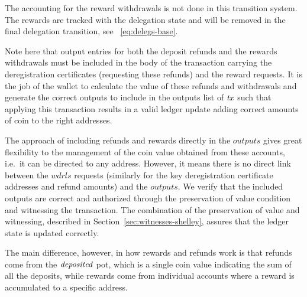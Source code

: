 The accounting for the reward withdrawals is not done in this transition system.
The rewards are tracked with the delegation state and will
be removed in the final delegation transition, see ~\ref{eq:delegs-base}.

Note here that output entries for both the deposit refunds and the rewards
withdrawals must be included in the body of the transaction
carrying the deregistration certificates (requesting these refunds) and the
reward requests. It is the job
of the wallet to calculate the value of these refunds and withdrawals and
generate the correct outputs to include in the outputs list of $\mathit{tx}$ such
that applying this transaction results in a
valid ledger update adding correct amounts of coin to the right addresses.

The approach of including refunds and rewards directly in the $outputs$ gives
great flexibility to the management of the coin value obtained from these
accounts, i.e.~it can be directed to any address. However, it means there is no
direct link between the $wdrls$ requests (similarly for the key deregistration
certificate addresses and refund amounts) and the $outputs$. We verify that
the included outputs are correct and authorized through the preservation of value condition
and witnessing the transaction. The combination of the
preservation of value and witnessing, described in Section~\ref{sec:witnesses-shelley},
assures that the ledger state is updated correctly.

The main difference, however, in how rewards and refunds work is that refunds
come from the $\mathit{deposited}$ pot, which is a single coin value indicating
the sum of all the deposits, while rewards come from individual
accounts where a reward is accumulated to a specific address.

